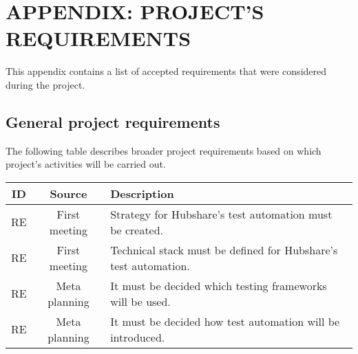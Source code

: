 \chapter{APPENDIX: PROJECT'S REQUIREMENTS}\label{appendix:projects_requirements}

This appendix contains a list of accepted requirements that were considered during the project.

\newcommand\reid{RE \stepcounter{RE}\arabic{RE}}

\section*{General project requirements}
The following table describes broader project requirements based on which project's activities will be carried out.
\begin{center}
	\begin{tabularx}{\textwidth}{|c|c|X|}
		\hline
		\textbf{ID} & \textbf{Source} & \textbf{Description}\\
		\hline
		\reid & First meeting & Strategy for Hubshare's test automation must be created.\\
		\hline
		\reid & First meeting & Technical stack must be defined for Hubshare's test automation.\\
		\hline
		\reid & Meta planning & It must be decided which testing frameworks will be used.\\
		\hline
		\reid & Meta planning & It must be decided how test automation will be introduced.\\
		\hline
	\end{tabularx}
\end{center}

